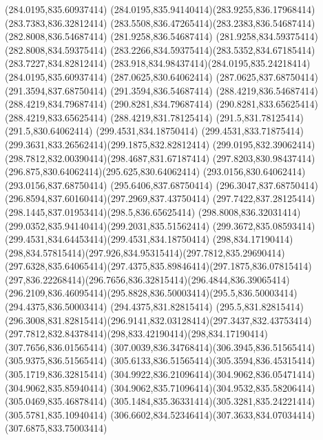 {{	\closepath
	\moveto(284.0195,835.60937414)
	\curveto(284.0195,835.94140414)(283.9255,836.17968414)(283.7383,836.32812414)
	\curveto(283.5508,836.47265414)(283.2383,836.54687414)(282.8008,836.54687414)
	\lineto(281.9258,836.54687414)
	\lineto(281.9258,834.59375414)
	\lineto(282.8008,834.59375414)
	\curveto(283.2266,834.59375414)(283.5352,834.67185414)(283.7227,834.82812414)
	\curveto(283.918,834.98437414)(284.0195,835.24218414)(284.0195,835.60937414)
	\closepath
	\moveto(287.0625,830.64062414)
	\lineto(287.0625,837.68750414)
	\lineto(291.3594,837.68750414)
	\lineto(291.3594,836.54687414)
	\lineto(288.4219,836.54687414)
	\lineto(288.4219,834.79687414)
	\lineto(290.8281,834.79687414)
	\lineto(290.8281,833.65625414)
	\lineto(288.4219,833.65625414)
	\lineto(288.4219,831.78125414)
	\lineto(291.5,831.78125414)
	\lineto(291.5,830.64062414)
	\closepath
	\moveto(299.4531,834.18750414)
	\curveto(299.4531,833.71875414)(299.3631,833.26562414)(299.1875,832.82812414)
	\curveto(299.0195,832.39062414)(298.7812,832.00390414)(298.4687,831.67187414)
	\curveto(297.8203,830.98437414)(296.875,830.64062414)(295.625,830.64062414)
	\lineto(293.0156,830.64062414)
	\lineto(293.0156,837.68750414)
	\lineto(295.6406,837.68750414)
	\curveto(296.3047,837.68750414)(296.8594,837.60160414)(297.2969,837.43750414)
	\curveto(297.7422,837.28125414)(298.1445,837.01953414)(298.5,836.65625414)
	\curveto(298.8008,836.32031414)(299.0352,835.94140414)(299.2031,835.51562414)
	\curveto(299.3672,835.08593414)(299.4531,834.64453414)(299.4531,834.18750414)
	\closepath
	\moveto(298,834.17190414)
	\curveto(298,834.57815414)(297.926,834.95315414)(297.7812,835.29690414)
	\curveto(297.6328,835.64065414)(297.4375,835.89846414)(297.1875,836.07815414)
	\curveto(297,836.22268414)(296.7656,836.32815414)(296.4844,836.39065414)
	\curveto(296.2109,836.46095414)(295.8828,836.50003414)(295.5,836.50003414)
	\lineto(294.4375,836.50003414)
	\lineto(294.4375,831.82815414)
	\lineto(295.5,831.82815414)
	\curveto(296.3008,831.82815414)(296.9141,832.03128414)(297.3437,832.43753414)
	\curveto(297.7812,832.84378414)(298,833.42190414)(298,834.17190414)
	\closepath
	\moveto(307.7656,836.01565414)
	\curveto(307.0039,836.34768414)(306.3945,836.51565414)(305.9375,836.51565414)
	\curveto(305.6133,836.51565414)(305.3594,836.45315414)(305.1719,836.32815414)
	\curveto(304.9922,836.21096414)(304.9062,836.05471414)(304.9062,835.85940414)
	\curveto(304.9062,835.71096414)(304.9532,835.58206414)(305.0469,835.46878414)
	\curveto(305.1484,835.36331414)(305.3281,835.24221414)(305.5781,835.10940414)
	\curveto(306.6602,834.52346414)(307.3633,834.07034414)(307.6875,833.75003414)
}}
